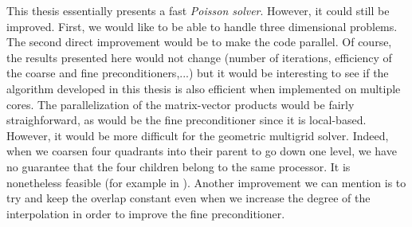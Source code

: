 This thesis essentially presents a fast \textit{Poisson solver}. However, it could still be improved. First, we would like to be able to handle three dimensional problems. The second direct improvement would be to make the code parallel. Of course, the results presented here would not change (number of iterations, efficiency of the coarse and fine preconditioners,...) but it would be interesting to see if the algorithm developed in this thesis is also efficient when implemented on multiple cores. The parallelization of the matrix-vector products would be fairly straighforward, as would be the fine preconditioner since it is local-based. However, it would be more difficult for the geometric multigrid solver. Indeed, when we coarsen four quadrants into their parent to go down one level, we have no guarantee that the four children belong to the same processor. It is nonetheless feasible (for example in \cite{multi_impl}). Another improvement we can mention is to try and keep the overlap constant even when we increase the degree of the interpolation in order to improve the fine preconditioner. 




